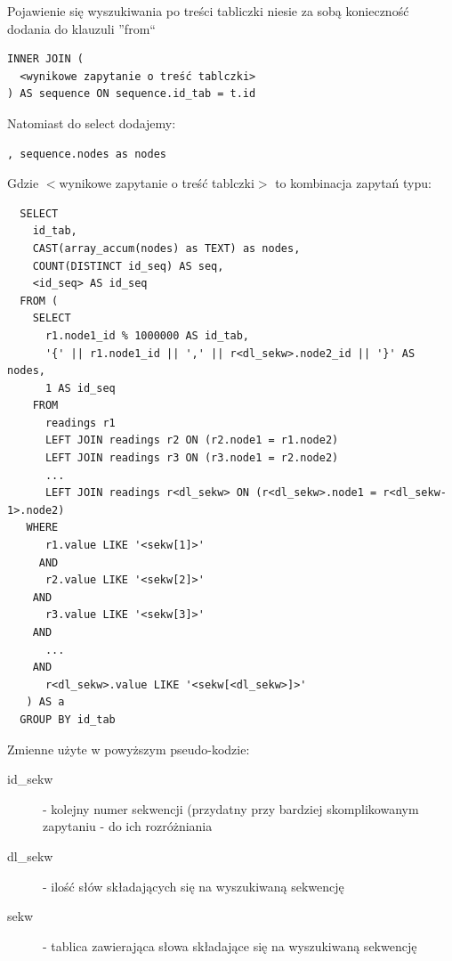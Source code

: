 \documentclass{pracamgr}
\begin{document}
Pojawienie się wyszukiwania po treści tabliczki niesie za sobą konieczność dodania do klauzuli ''from`` 
\begin{verbatim}
INNER JOIN (
  <wynikowe zapytanie o treść tablczki>
) AS sequence ON sequence.id_tab = t.id
\end{verbatim}

Natomiast do select dodajemy:
\begin{verbatim}
, sequence.nodes as nodes
\end{verbatim}

Gdzie $<$wynikowe zapytanie o treść tablczki$>$ to kombinacja zapytań typu:
\begin{verbatim}
  SELECT 
    id_tab, 
    CAST(array_accum(nodes) as TEXT) as nodes, 
    COUNT(DISTINCT id_seq) AS seq, 
    <id_seq> AS id_seq
  FROM (
    SELECT
      r1.node1_id % 1000000 AS id_tab,
      '{' || r1.node1_id || ',' || r<dl_sekw>.node2_id || '}' AS nodes,
      1 AS id_seq
    FROM
      readings r1
      LEFT JOIN readings r2 ON (r2.node1 = r1.node2)
      LEFT JOIN readings r3 ON (r3.node1 = r2.node2)
      ...
      LEFT JOIN readings r<dl_sekw> ON (r<dl_sekw>.node1 = r<dl_sekw-1>.node2)
   WHERE
      r1.value LIKE '<sekw[1]>'
     AND
      r2.value LIKE '<sekw[2]>'
    AND
      r3.value LIKE '<sekw[3]>'
    AND
      ...
    AND
      r<dl_sekw>.value LIKE '<sekw[<dl_sekw>]>'
   ) AS a 
  GROUP BY id_tab
\end{verbatim}
Zmienne użyte w powyższym pseudo-kodzie:
\begin{description}
 \item[id\_sekw] - kolejny numer sekwencji (przydatny przy bardziej skomplikowanym zapytaniu - do ich rozróżniania
 \item[dl\_sekw] - ilość słów składających się na wyszukiwaną sekwencję
 \item[sekw] - tablica zawierająca słowa składające się na wyszukiwaną sekwencję
 \end{description}
\end{document}
